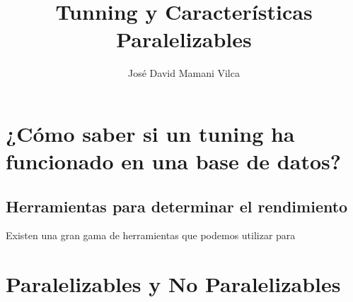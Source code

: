 \documentclass[12pt,conference]{IEEEtran}
\begin{document}
\title{Tunning y Características Paralelizables}

\author{José David Mamani Vilca}%

\onecolumn

\maketitle

\section{¿Cómo saber si un tuning ha funcionado en una base de datos?}

\subsection{Herramientas para determinar el rendimiento}
Existen una gran gama de herramientas que podemos utilizar para 

\section{Paralelizables y No Paralelizables}
\end{document}
